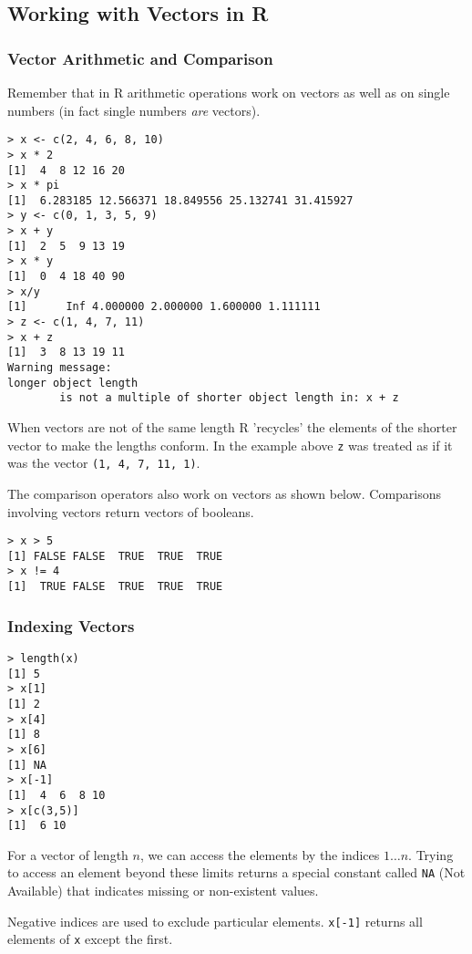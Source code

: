\subsection{Working with Vectors in R}

\subsubsection{Vector Arithmetic and Comparison}

Remember that in R arithmetic operations work on vectors as well as on
single numbers (in fact single numbers \emph{are} vectors).

\begin{lstlisting}
> x <- c(2, 4, 6, 8, 10)
> x * 2
[1]  4  8 12 16 20
> x * pi
[1]  6.283185 12.566371 18.849556 25.132741 31.415927
> y <- c(0, 1, 3, 5, 9)
> x + y
[1]  2  5  9 13 19
> x * y
[1]  0  4 18 40 90
> x/y
[1]      Inf 4.000000 2.000000 1.600000 1.111111
> z <- c(1, 4, 7, 11)
> x + z
[1]  3  8 13 19 11
Warning message:
longer object length
        is not a multiple of shorter object length in: x + z 
\end{lstlisting}
When vectors are not of the same length R 'recycles' the elements of the
shorter vector to make the lengths conform. In the example above
\lstinline!z! was treated as if it was the vector
\lstinline!(1, 4, 7, 11, 1)!.

The comparison operators also work on vectors as shown below.
Comparisons involving vectors return vectors of booleans.

\begin{lstlisting}
> x > 5
[1] FALSE FALSE  TRUE  TRUE  TRUE
> x != 4
[1]  TRUE FALSE  TRUE  TRUE  TRUE
\end{lstlisting}
\subsubsection{Indexing Vectors}

\begin{lstlisting}
> length(x)
[1] 5
> x[1]
[1] 2
> x[4]
[1] 8
> x[6]
[1] NA
> x[-1]
[1]  4  6  8 10
> x[c(3,5)]
[1]  6 10
\end{lstlisting}
For a vector of length $n$, we can access the elements by the indices
$1 \ldots n$. Trying to access an element beyond these limits returns a
special constant called \lstinline!NA! (Not Available) that indicates
missing or non-existent values.

Negative indices are used to exclude particular elements.
\lstinline!x[-1]! returns all elements of \lstinline!x! except the
first.


